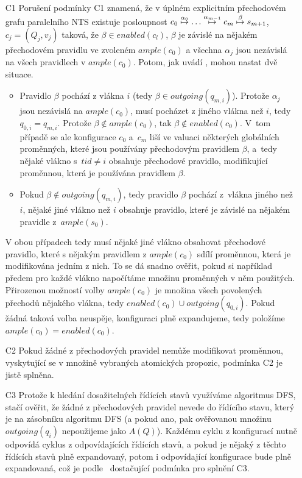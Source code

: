 \documentclass[12pt]{fithesis2}
\begin{document}
\begin{enumerate}
\item[C1] Porušení podmínky C1 \label{subsec:c1-violation} znamená, že v úplném explicitním přechodovém grafu paralelního NTS existuje posloupnost $c_0 \overset{\alpha_0}{\mapsto} \ldots \overset{\alpha_{m-1}}{\mapsto} c_m \overset{\beta}{\mapsto} s_{m+1}$, $c_j = (Q_j, v_j)$ taková, že $\beta \in \mathit{enabled}(c_l)$, $\beta$ je závislé na nějakém přechodovém pravidlu ve zvoleném $\mathit{ample}(c_0)$ a všechna $\alpha_j$ jsou nezávislá na všech pravidlech v $\mathit{ample}(c_0)$. Potom, jak uvádí \cite{CLARKE}, mohou nastat dvě situace.

	\begin{itemize}
		\item Pravidlo $\beta$ pochází z vlákna $i$ (tedy $\beta \in \mathit{outgoing}(q_{m,i})$).  Protože $\alpha_j$ jsou nezávislá na $\mathit{ample}(c_0)$, musí pocházet z jiného vlákna než $i$, tedy $q_{0,i} = q_{m,i}$. Protože $\beta \not \in \mathit{ample}(c_0)$, tak $\beta \not \in \mathit{enabled}(c_0)$. V~tom případě se ale konfigurace $c_0$ a~$c_m$ liší ve valuaci některých globálních proměnných, které jsou používány přechodovým pravidlem $\beta$, a~tedy nějaké vlákno s~$tid \neq i$ obsahuje přechodové pravidlo, modifikující proměnnou, která je používána pravidlem $\beta$.

		\item Pokud $\beta \not \in \mathit{outgoing}(q_{m,i})$, tedy pravidlo $\beta$ pochází z~vlákna jiného než $i$, nějaké jiné vlákno než $i$ obsahuje pravidlo, které je závislé na nějakém pravidle z~$\mathit{ample}(s_0)$.
	\end{itemize}

	V obou případech tedy musí nějaké jiné vlákno obsahovat přechodové pravidlo, které s nějakým pravidlem z $\mathit{ample}(c_0)$ sdílí proměnnou, která je modifikována jedním z nich. To se dá snadno ověřit, pokud si například předem pro každé vlákno napočítáme množinu proměnných v něm použitých. Přirozenou možností volby $\mathit{ample}(c_0)$ je množina všech povolených přechodů nějakého vlákna, tedy $\mathit{enabled}(c_0) \cup \mathit{outgoing}(q_{0, i})$. Pokud žádná taková volba neuspěje, konfiguraci plně expandujeme, tedy položíme $\mathit{ample}(c_0) = \mathit{enabled}(c_0)$.

\item[C2] Pokud žádné z přechodových pravidel nemůže modifikovat proměnnou, vyskytující se v množině vybraných atomických propozic, podmínka C2 je jistě splněna.

\item[C3] Protože k hledání dosažitelných řídících stavů využíváme algoritmus DFS, stačí ověřit, že žádné z přechodových pravidel nevede do řídícího stavu, který je na zásobníku algoritmu DFS (a pokud ano, pak ověřovanou množinu $\mathit{outgoing}(q_i)$ nepoužijeme jako $A(Q)$). Každému cyklu z konfigurací nutně odpovídá cyklus z odpovídajících řídících stavů, a pokud je nějaký z těchto řídících stavů plně expandovaný, potom i odpovídající konfigurace bude plně expandovaná, což je podle~\cite{CLARKE} dostačující podmínka pro splnění C3.

\end{enumerate}
\end{document}
